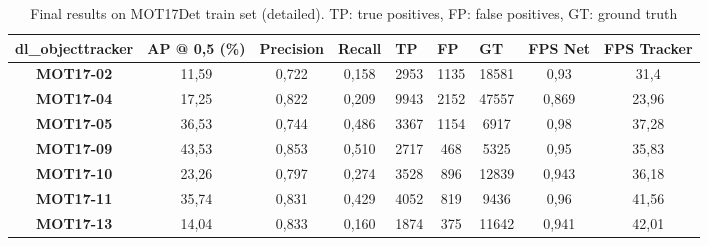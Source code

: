\begin{table}[H]
\scriptsize 

\begin{tabular}{|c|c|c|c|c|c|c|c|c|}
\hline
\textbf{dl\_objecttracker} & \textbf{AP @ 0,5 (\%)} & \multicolumn{1}{l|}{\textbf{Precision}} & \multicolumn{1}{l|}{\textbf{Recall}} & \multicolumn{1}{l|}{\textbf{TP}} & \multicolumn{1}{l|}{\textbf{FP}} & \multicolumn{1}{l|}{\textbf{GT}} & \textbf{FPS Net} & \multicolumn{1}{l|}{\textbf{FPS Tracker}} \\ \hline
\textbf{MOT17-02}          & 11,59                  & 0,722                                   & 0,158                                & 2953                             & 1135                             & 18581                            & 0,93             & 31,4                                      \\ \hline
\textbf{MOT17-04}          & 17,25                  & 0,822                                   & 0,209                                & 9943                             & 2152                             & 47557                            & 0,869            & 23,96                                     \\ \hline
\textbf{MOT17-05}          & 36,53                  & 0,744                                   & 0,486                                & 3367                             & 1154                             & 6917                             & 0,98             & 37,28                                     \\ \hline
\textbf{MOT17-09}          & 43,53                  & 0,853                                   & 0,510                                & 2717                             & 468                              & 5325                             & 0,95             & 35,83                                     \\ \hline
\textbf{MOT17-10}          & 23,26                  & 0,797                                   & 0,274                                & 3528                             & 896                              & 12839                            & 0,943            & 36,18                                     \\ \hline
\textbf{MOT17-11}          & 35,74                  & 0,831                                   & 0,429                                & 4052                             & 819                              & 9436                             & 0,96             & 41,56                                     \\ \hline
\textbf{MOT17-13}          & 14,04                  & 0,833                                   & 0,160                                & 1874                             & 375                              & 11642                            & 0,941            & 42,01                                     \\ \hline
\end{tabular}

\caption{Final results on MOT17Det train set (detailed). TP: true positives, FP: false positives, GT: ground truth}
\label{tab:annex_2}
\end{table}

